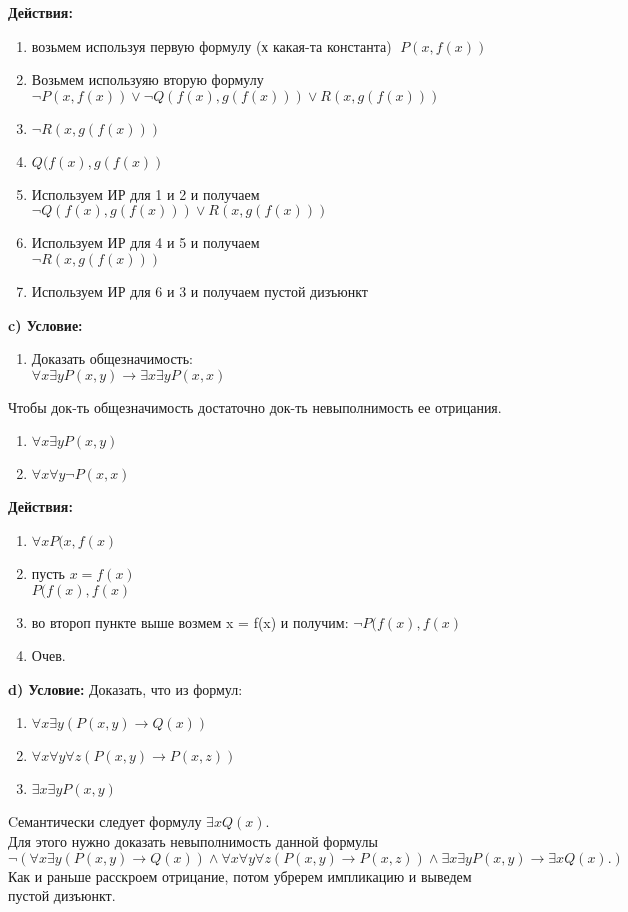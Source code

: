 \documentclass[a4paper,12pt]{article} %
\begin{document}
\textbf{Действия:}
\begin{enumerate}
    \item возьмем используя первую формулу (х какая-та константа) $\; P(x, f(x))$
    \item Возьмем используяю вторую формулу  \\
    $\neg P(x, f(x)) \vee \neg Q(f(x), g(f(x))) \vee R(x, g(f(x)))$
    \item $\neg R(x, g(f(x)))$
    \item $ Q(f(x), g(f(x))$ 
    \item Используем ИР для 1 и 2 и получаем \\
    $\neg Q(f(x), g(f(x))) \vee R(x, g(f(x)))$
    \item Используем ИР для 4 и 5 и получаем \\
    $\neg R(x, g(f(x)))$
    \item Используем ИР для 6 и 3 и получаем пустой дизъюнкт\\
\end{enumerate}


\textbf{c) Условие:}
\begin{enumerate}
    \item Доказать общезначимость: \\
    $\forall x \exists y P(x, y) \rightarrow \exists x \exists y P(x, x)$
\end{enumerate}
Чтобы док-ть
общезначимость достаточно док-ть невыполнимость ее отрицания.
\begin{enumerate}
    \item $\forall x \exists y P(x, y)$
    \item $ \forall x \forall y \neg P(x, x) $
\end{enumerate}
\textbf{Действия:}
\begin{enumerate}
    \item $\forall x P(x, f(x)$
    \item пусть $x = f(x)$ \\
    $P(f(x), f(x)$
    \item во второп пункте выше возмем x = f(x) и получим:
    $\neg P(f(x), f(x)$
    \item Очев.
\end{enumerate}
\textbf{d) Условие:} 
Доказать, что из формул:
\begin{enumerate}
    \item $\forall x \exists y(P(x, y) \rightarrow Q(x))$
    \item $\forall x \forall y \forall z (P(x, y) \rightarrow P(x, z))$
    \item $\exists x \exists y P(x, y)$ 
\end{enumerate}
Cемантически следует формулу $\exists x Q(x)$. \\
Для этого нужно доказать невыполнимость данной формулы
\[
    \neg(\forall x \exists y(P(x, y) \rightarrow Q(x)) \wedge
    \forall x \forall y \forall z (P(x, y) \rightarrow P(x, z)) \wedge
    \exists x \exists y P(x, y) \rightarrow \exists x Q(x).)
\]
Как и раньше расскроем отрицание, потом убререм импликацию и выведем пустой дизъюнкт.
\end{document}

